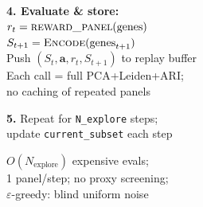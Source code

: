 \documentclass[8pt]{article}
\newlength{\colw}
\begin{document}
\begin{minipage}[t]{\colw}
\begin{warnbox}
\textbf{4. Evaluate \& store:}\\
$r_t = \textsc{reward\_panel}(\text{genes})$\\
$S_{t+1} = \textsc{Encode}(\text{genes}_{t+1})$\\
Push $(S_t, \mathbf{a}, r_t, S_{t+1})$ to replay buffer\\
{\scriptsize\color{removed} Each call = full PCA+Leiden+ARI;\\
no caching of repeated panels}
\end{warnbox}\vspace{1pt}

\begin{stepbox}
\textbf{5.} Repeat for \texttt{N\_explore} steps;\\
update \texttt{current\_subset} each step
\end{stepbox}

\vspace{3pt}
\begin{center}
{\scriptsize\color{black!50} $O(N_\text{explore})$ expensive evals;\\
1 panel/step; no proxy screening;\\
$\varepsilon$-greedy: blind uniform noise}
\end{center}
\end{minipage}%
\hfill
\end{document}
